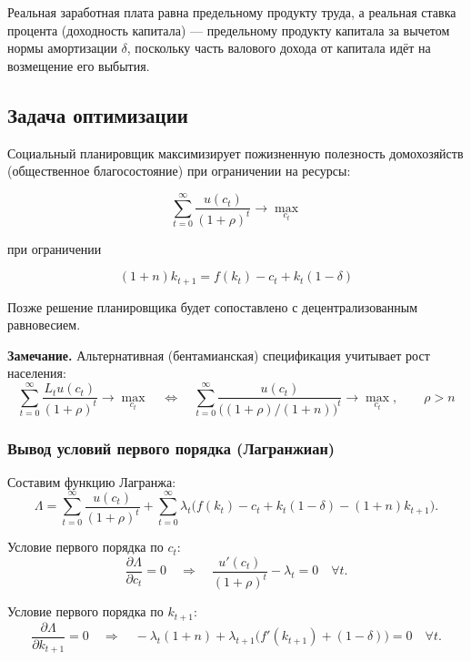 \documentclass[10pt,a4paper]{article}
\begin{document}
\begin{intuition}
Реальная заработная плата равна предельному продукту труда, а реальная ставка процента (доходность капитала) — предельному продукту капитала за вычетом нормы амортизации $\delta$, поскольку часть валового дохода от капитала идёт на возмещение его выбытия.
\end{intuition}

\subsection{Задача оптимизации}

Социальный планировщик максимизирует пожизненную полезность домохозяйств (общественное благосостояние) при ограничении на ресурсы:
\begin{formulabox}
\begin{equation}
\sum_{t=0}^{\infty} \frac{u(c_t)}{(1+\rho)^t} \to \max_{c_t} \tag{3.8}
\end{equation}
\end{formulabox}
при ограничении
\begin{formulabox}
\begin{equation*}
(1+n)k_{t+1} = f(k_t) - c_t + k_t(1-\delta) \tag{3.5}
\end{equation*}
\end{formulabox}

Позже решение планировщика будет сопоставлено с децентрализованным равновесием.

\textbf{Замечание.} Альтернативная (бентамианская) спецификация учитывает рост населения:
$$\sum_{t=0}^{\infty} \frac{L_t u(c_t)}{(1+\rho)^t} \to \max_{c_t} \quad \Leftrightarrow \quad \sum_{t=0}^{\infty} \frac{u(c_t)}{\big((1+\rho)/(1+n)\big)^t} \to \max_{c_t}, \qquad \rho > n$$

\subsubsection{Вывод условий первого порядка (Лагранжиан)}

Составим функцию Лагранжа:
$$\Lambda = \sum_{t=0}^{\infty} \frac{u(c_t)}{(1+\rho)^t} + \sum_{t=0}^{\infty} \lambda_t\Big(f(k_t) - c_t + k_t(1-\delta) - (1+n)k_{t+1}\Big).$$

Условие первого порядка по $c_t$:
$$\frac{\partial \Lambda}{\partial c_t} = 0 \quad \Rightarrow \quad \frac{u'(c_t)}{(1+\rho)^t} - \lambda_t = 0 \quad \forall t.$$

Условие первого порядка по $k_{t+1}$:
$$\frac{\partial \Lambda}{\partial k_{t+1}} = 0 \quad \Rightarrow \quad -\lambda_t(1+n) + \lambda_{t+1}\big(f'(k_{t+1}) + (1-\delta)\big) = 0 \quad \forall t.$$
\end{document}

